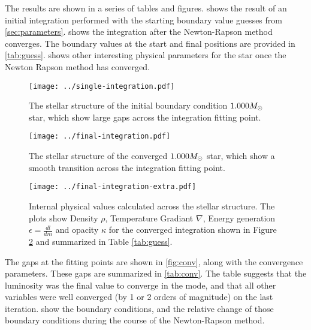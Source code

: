 \documentclass[10pt]{article}
\begin{document}
The results are shown in a series of tables and figures.  shows the result of an initial integration performed with the starting boundary value guesses from \cref{sec:parameters}.  shows the integration after the Newton-Rapson method converges. The boundary values at the start and final positions are provided in \cref{tab:guess}.  shows other interesting physical parameters for the star once the Newton Rapson method has converged.

 \begin{figure}[htbp]
    \centering
    \texttt{[image: ../single-integration.pdf]}
    \caption[Initial Integration]{The stellar structure of the initial boundary condition $1.000 M_\odot$ star, which show large gaps across the integration fitting point.}
    \label{fig:firstint}
 \end{figure}
 
 \begin{figure}[htbp]
    \centering
    \texttt{[image: ../final-integration.pdf]}
    \caption[Converged Integration]{The stellar structure of the converged $1.000 M_\odot$ star, which show a smooth transition across the integration fitting point.}
    \label{fig:finalint}
 \end{figure}
 

 \begin{figure}[htbp]
    \centering
    \texttt{[image: ../final-integration-extra.pdf]}
    \caption[Properties of the Converged Integration]{Internal physical values calculated across the stellar structure. The plots show Density $\rho$, Temperature Gradiant $\nabla$, Energy generation $\epsilon = \frac{dl}{dm}$ and opacity $\kappa$ for the converged integration shown in Figure \ref{fig:finalint} and summarized in Table \ref{tab:guess}. }
    \label{fig:finalintextra}
 \end{figure}
 
\begin{table}[htbp]
\begin{center}
\label{tab:guess}

\end{center}
\end{table}

The gaps at the fitting points are shown in \cref{fig:conv}, along with the convergence parameters. These gaps are summarized in \cref{tab:conv}. The table suggests that the luminosity was the final value to converge in the mode, and that all other variables were well converged (by 1 or 2 orders of magnitude) on the last iteration.  show the boundary conditions, and the relative change of those boundary conditions during the course of the Newton-Rapson method.
\end{document}
